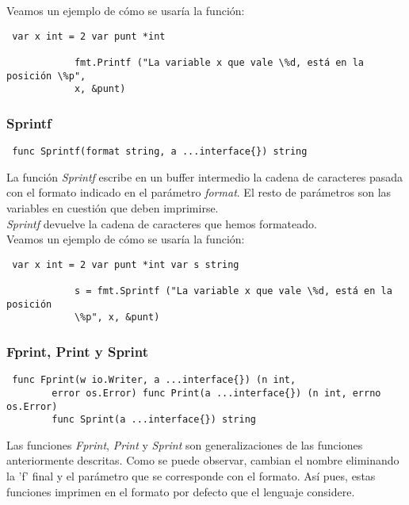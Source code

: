 		Veamos un ejemplo de cómo se usaría la función:
		
		\begin{verbatim} var x int = 2 var punt *int
		
			fmt.Printf ("La variable x que vale \%d, está en la posición \%p",
			x, &punt) \end{verbatim}
		
		\subsubsection{Sprintf}
		
		\begin{verbatim} func Sprintf(format string, a ...interface{}) string
		\end{verbatim}
		
		La función \textit{Sprintf} escribe en un buffer intermedio la cadena de
		caracteres pasada con el formato indicado en el parámetro
		\textit{format}. El resto de parámetros son las variables en cuestión
		que deben imprimirse.\\
		
		\textit{Sprintf} devuelve la cadena de caracteres que hemos
		formateado.\\
		
		Veamos un ejemplo de cómo se usaría la función:
		
		\begin{verbatim} var x int = 2 var punt *int var s string
		
			s = fmt.Sprintf ("La variable x que vale \%d, está en la posición
			\%p", x, &punt) \end{verbatim}
		
		\subsubsection{Fprint, Print y Sprint}
		
		\begin{verbatim} func Fprint(w io.Writer, a ...interface{}) (n int,
		error os.Error) func Print(a ...interface{}) (n int, errno os.Error)
		func Sprint(a ...interface{}) string \end{verbatim}
		
		Las funciones \textit{Fprint}, \textit{Print} y \textit{Sprint} son
		generalizaciones de las funciones anteriormente descritas. Como se puede
		observar, cambian el nombre eliminando la 'f' final y el parámetro que
		se corresponde con el formato. Así pues, estas funciones imprimen en el
		formato por defecto que el lenguaje considere.\\
				
